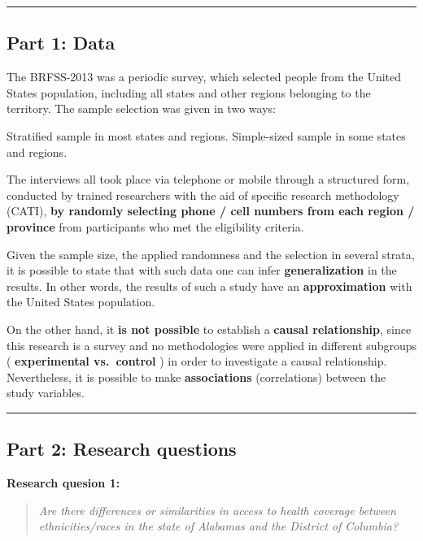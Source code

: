 \documentclass[]{article}
\begin{document}
\begin{center}\rule{0.5\linewidth}{\linethickness}\end{center}

\hypertarget{part-1-data}{%
\subsection{Part 1: Data}\label{part-1-data}}

The BRFSS-2013 was a periodic survey, which selected people from the
United States population, including all states and other regions
belonging to the territory. The sample selection was given in two ways:

Stratified sample in most states and regions. Simple-sized sample in
some states and regions.

The interviews all took place via telephone or mobile through a
structured form, conducted by trained researchers with the aid of
specific research methodology (CATI), \textbf{by randomly selecting
phone / cell numbers from each region / province} from participants who
met the eligibility criteria.

Given the sample size, the applied randomness and the selection in
several strata, it is possible to state that with such data one can
infer \textbf{generalization} in the results. In other words, the
results of such a study have an \textbf{approximation} with the United
States population.

On the other hand, it \textbf{is not possible} to establish a
\textbf{causal relationship}, since this research is a survey and no
methodologies were applied in different subgroups ( \textbf{experimental
vs.~control} ) in order to investigate a causal relationship.
Nevertheless, it is possible to make \textbf{associations}
(correlations) between the study variables.

\begin{center}\rule{0.5\linewidth}{\linethickness}\end{center}

\hypertarget{part-2-research-questions}{%
\subsection{Part 2: Research
questions}\label{part-2-research-questions}}

\textbf{Research quesion 1:}

\begin{quote}
\emph{Are there differences or similarities in access to health coverage
between ethnicities/races in the state of Alabamas and the District of
Columbia?}
\end{quote}
\end{document}
